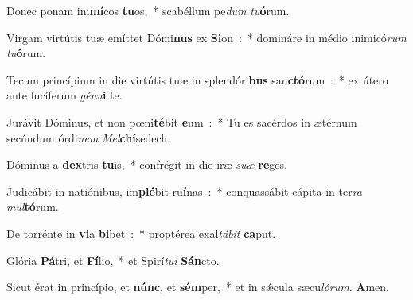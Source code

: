 ﻿\item Donec ponam ini\textbf{mí}\-cos \textbf{tu}os,~* scabéllum pe\emph{dum} \emph{tu}\textbf{ó}rum.
\item Virgam virtútis tuæ emíttet Dómi\textbf{nus} ex \textbf{Si}\-on~:~* domináre in médio inimicó\emph{rum} \emph{tu}\textbf{ó}rum.
\item Tecum princípium in die virtútis tuæ in splen\-dó\-ri\textbf{bus} san\textbf{ctó}\-rum~:~* ex útero ante lucíferum \emph{gé}\-\emph{nu}\-\textbf{i} te.
\item Jurávit Dóminus, et non pœni\textbf{té}\-bit \textbf{e}\-um~:~* Tu es sacérdos in ætérnum secúndum órdi\emph{nem} \emph{Mel}\textbf{chí}sedech.
\item Dóminus a \textbf{dex}\-tris \textbf{tu}\-is,~* confrégit in die iræ \emph{su}\-\emph{æ} \textbf{re}ges.
\item Judicábit in natiónibus, im\textbf{plé}\-bit ru\textbf{í}\-nas~:~* conquassábit cápita in ter\emph{ra} \emph{mul}\textbf{tó}rum.
\item De torrénte in \textbf{vi}\-a \textbf{bi}\-bet~:~* proptérea exal\emph{tá}\-\emph{bit} \textbf{ca}put.
\item Glória \textbf{Pá}\-tri, et \textbf{Fí}\-lio,~* et Spirí\emph{tu}\-\emph{i} \textbf{Sán}cto.
\item Sicut érat in princípio, et \textbf{núnc}, et \textbf{sém}\-per,~* et in sǽcula sæcu\emph{ló}\-\emph{rum}. \textbf{A}men.
